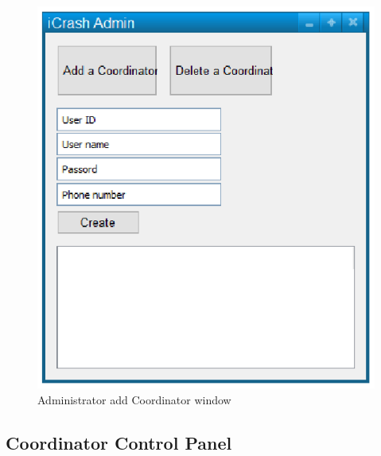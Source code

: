 \begin{figure}
  \centering
    \includegraphics{images/mockups/feature1-login/AdminAddCoordinator.eps}
  \caption{Administrator add Coordinator window}
  \label{fig:AdminAddCoordinator}
\end{figure}


\subsection{Coordinator Control Panel}

